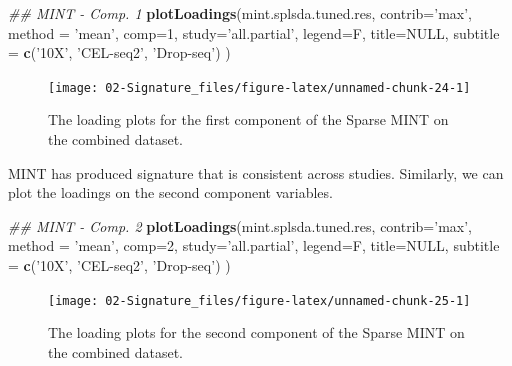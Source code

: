 \documentclass[]{book}
\newenvironment{Shaded}{\begin{snugshade}}{\end{snugshade}}
\newcommand{\CommentTok}[1]{\textcolor[rgb]{0.56,0.35,0.01}{\textit{#1}}}
\newcommand{\DataTypeTok}[1]{\textcolor[rgb]{0.13,0.29,0.53}{#1}}
\newcommand{\DecValTok}[1]{\textcolor[rgb]{0.00,0.00,0.81}{#1}}
\newcommand{\KeywordTok}[1]{\textcolor[rgb]{0.13,0.29,0.53}{\textbf{#1}}}
\newcommand{\NormalTok}[1]{#1}
\newcommand{\OtherTok}[1]{\textcolor[rgb]{0.56,0.35,0.01}{#1}}
\newcommand{\StringTok}[1]{\textcolor[rgb]{0.31,0.60,0.02}{#1}}
\theoremstyle{definition}
\theoremstyle{definition}
\theoremstyle{definition}
\theoremstyle{remark}
\begin{document}
\begin{Shaded}
\begin{Highlighting}[]
\CommentTok{## MINT - Comp. 1}
\KeywordTok{plotLoadings}\NormalTok{(mint.splsda.tuned.res, }\DataTypeTok{contrib=}\StringTok{'max'}\NormalTok{, }\DataTypeTok{method =} \StringTok{'mean'}\NormalTok{, }\DataTypeTok{comp=}\DecValTok{1}\NormalTok{, }
             \DataTypeTok{study=}\StringTok{'all.partial'}\NormalTok{, }\DataTypeTok{legend=}\NormalTok{F, }\DataTypeTok{title=}\OtherTok{NULL}\NormalTok{, }
             \DataTypeTok{subtitle =} \KeywordTok{c}\NormalTok{(}\StringTok{'10X'}\NormalTok{, }\StringTok{'CEL-seq2'}\NormalTok{, }\StringTok{'Drop-seq'}\NormalTok{) )}
\end{Highlighting}
\end{Shaded}

\begin{figure}[ht]

{\centering \texttt{[image: 02-Signature\_files/figure-latex/unnamed-chunk-24-1]} 

}

\caption{The loading plots for the first component of the Sparse MINT on the combined dataset.}\label{fig:unnamed-chunk-24}
\end{figure}

MINT has produced signature that is consistent across studies.
Similarly, we can plot the loadings on the second component variables.

\begin{Shaded}
\begin{Highlighting}[]
\CommentTok{## MINT - Comp. 2}
\KeywordTok{plotLoadings}\NormalTok{(mint.splsda.tuned.res, }\DataTypeTok{contrib=}\StringTok{'max'}\NormalTok{, }\DataTypeTok{method =} \StringTok{'mean'}\NormalTok{, }\DataTypeTok{comp=}\DecValTok{2}\NormalTok{, }
             \DataTypeTok{study=}\StringTok{'all.partial'}\NormalTok{, }\DataTypeTok{legend=}\NormalTok{F, }\DataTypeTok{title=}\OtherTok{NULL}\NormalTok{, }
             \DataTypeTok{subtitle =} \KeywordTok{c}\NormalTok{(}\StringTok{'10X'}\NormalTok{, }\StringTok{'CEL-seq2'}\NormalTok{, }\StringTok{'Drop-seq'}\NormalTok{) )}
\end{Highlighting}
\end{Shaded}

\begin{figure}[ht]

{\centering \texttt{[image: 02-Signature\_files/figure-latex/unnamed-chunk-25-1]} 

}

\caption{The loading plots for the second component of the Sparse MINT on the combined dataset.}\label{fig:unnamed-chunk-25}
\end{figure}
\end{document}

